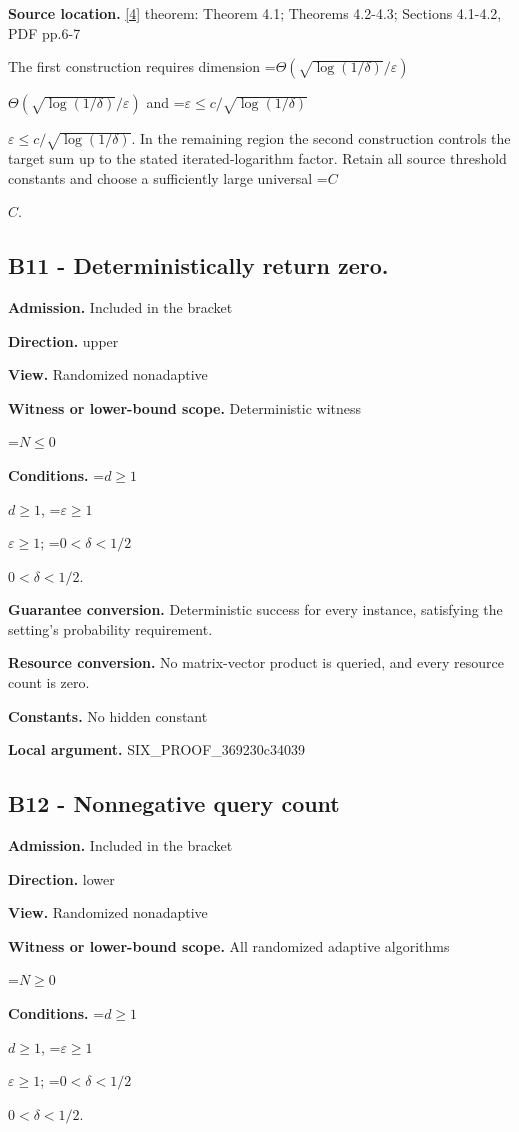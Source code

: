 \documentclass[10pt,a4paper]{article}
\newcommand{\AtlasMath}[1]{\par\begingroup\centering\setbox0=\hbox{$\displaystyle #1$}\ifdim\wd0>1.4\linewidth\typeout{ATLAS WIDE FORMULA: \the\wd0}\fi\ifdim\wd0>\linewidth\resizebox{\linewidth}{!}{\box0}\else\box0\fi\par\endgroup}
\newcommand{\AtlasInlineMath}[1]{\begingroup\setbox0=\hbox{$#1$}\ifdim\wd0>.4\linewidth\endgroup\AtlasMath{#1}\else\endgroup$#1$\fi}
\begin{document}
\textbf{Source location.} \href{https://proceedings.neurips.cc/paper/2021/file/c77bfda61a0204d445185053e6a9a8fe-Paper.pdf}{[4]} theorem: Theorem 4.1; Theorems 4.2-4.3; Sections 4.1-4.2, PDF pp.6-7

The first construction requires dimension \AtlasInlineMath{\Theta(\sqrt{\log(1/\delta)}/\varepsilon)} and \AtlasInlineMath{\varepsilon\le c/\sqrt{\log(1/\delta)}}. In the remaining region the second construction controls the target sum up to the stated iterated-logarithm factor. Retain all source threshold constants and choose a sufficiently large universal \AtlasInlineMath{C}.

\subsection{B11 - Deterministically return zero.}
\textbf{Admission.} Included in the bracket

\textbf{Direction.} upper

\textbf{View.} Randomized nonadaptive

\textbf{Witness or lower-bound scope.} Deterministic witness

\AtlasMath{N\le0}
\textbf{Conditions.} \AtlasInlineMath{d\ge1}, \AtlasInlineMath{\varepsilon\ge1}; \AtlasInlineMath{0<\delta<1/2}.

\textbf{Guarantee conversion.} Deterministic success for every instance, satisfying the setting's probability requirement.

\textbf{Resource conversion.} No matrix-vector product is queried, and every resource count is zero.

\textbf{Constants.} No hidden constant

\textbf{Local argument.} SIX\_\allowbreak{}PROOF\_\allowbreak{}369230c34039

\subsection{B12 - Nonnegative query count}
\textbf{Admission.} Included in the bracket

\textbf{Direction.} lower

\textbf{View.} Randomized nonadaptive

\textbf{Witness or lower-bound scope.} All randomized adaptive algorithms

\AtlasMath{N\ge0}
\textbf{Conditions.} \AtlasInlineMath{d\ge1}, \AtlasInlineMath{\varepsilon\ge1}; \AtlasInlineMath{0<\delta<1/2}.
\end{document}
